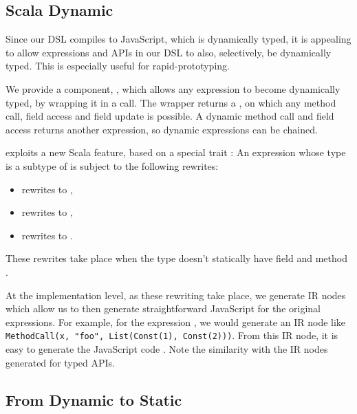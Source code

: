 \documentclass[runningheads,a4paper]{llncs}
\begin{document}

\subsection{Scala Dynamic}\label{sec:dynamic}
Since our DSL compiles to JavaScript, which is dynamically typed, it
is appealing to allow expressions and APIs in our DSL to also,
selectively, be dynamically typed. This is especially useful for
rapid-prototyping.

We provide a component, , which allows any expression to become
dynamically typed, by wrapping it in a  call. The
 wrapper returns a , on which any
method call, field access and field update is possible. A dynamic
method call and field access returns another 
expression, so dynamic expressions can be chained.

 exploits a new Scala feature, based on a
special trait : An expression whose type  is a
subtype of  is subject to the following rewrites:
\begin{itemize}
\item {} rewrites to ,
\item {} rewrites to ,
\item {} rewrites to .
\end{itemize}
These rewrites take place when the type  doesn't statically
have field  and method .

At the implementation level, as these rewriting take place, we
generate IR nodes which allow us to then generate straightforward
JavaScript for the original expressions. For example, for the
expression , we would generate an IR node
like {\tt\small MethodCall(x, "foo", List(Const(1), Const(2)))}. From this
IR node, it is easy to generate the JavaScript code . Note the similarity with the IR nodes generated for typed APIs.

\subsection{From Dynamic to Static}\label{sec:dynamic2static}
\end{document}
